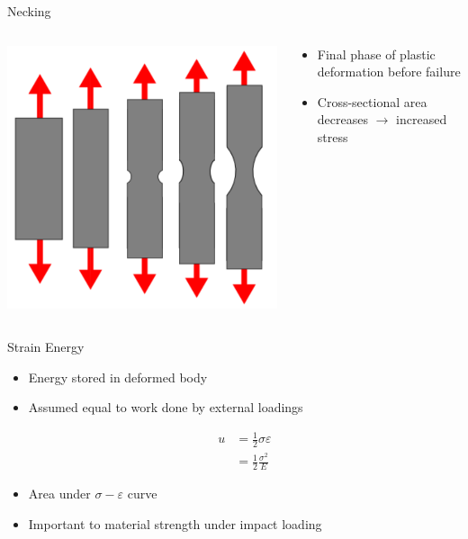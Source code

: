 \documentclass[10pt, svgnames]{beamer}
\begin{document}
\begin{frame}[label={sec:org0de069b}]{Necking}
\begin{columns}
\begin{column}{0.5\columnwidth}
\begin{center}
\includegraphics[width=.9\linewidth]{pictures/necking.png}
\end{center}
\end{column}

\begin{column}{0.5\columnwidth}
\begin{itemize}
\item Final phase of plastic deformation before failure

\item Cross-sectional area decreases \(\rightarrow\) increased stress
\end{itemize}
\end{column}
\end{columns}
\end{frame}

\begin{frame}[label={sec:org47641b5}]{Strain Energy}
\begin{itemize}
\item Energy stored in deformed body

\item Assumed equal to work done by external loadings

\begin{align*}
  u &= \frac{1}{2}\sigma\varepsilon \\
    &= \frac{1}{2}\frac{\sigma^2}{E}
\end{align*}

\item Area under \(\sigma-\varepsilon\) curve

\item Important to material strength under impact loading
\end{itemize}
\end{frame}
\end{document}
